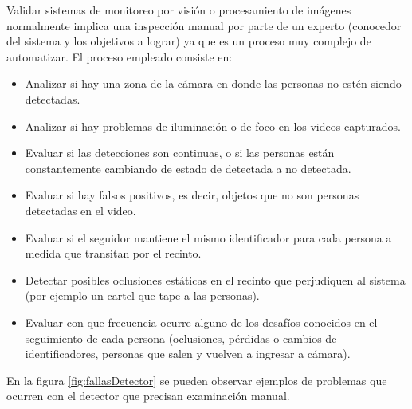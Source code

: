 Validar sistemas de monitoreo por visión o procesamiento de imágenes normalmente implica una inspección manual por parte de un experto (conocedor del sistema y los objetivos a lograr) ya que es un proceso muy complejo de automatizar. El proceso empleado consiste en:

\begin{itemize}
\item Analizar si hay una zona de la cámara en donde las personas no estén siendo detectadas.
\item Analizar si hay problemas de iluminación o de foco en los videos capturados.
\item Evaluar si las detecciones son continuas, o si las personas están constantemente cambiando de estado de detectada a no detectada.
\item Evaluar si hay falsos positivos, es decir, objetos que no son personas detectadas en el video.
\item Evaluar si el seguidor mantiene el mismo identificador para cada persona a medida que transitan por el recinto.
\item Detectar posibles oclusiones estáticas en el recinto que perjudiquen al sistema (por ejemplo un cartel que tape a las personas).
\item Evaluar con que frecuencia ocurre alguno de los desafíos conocidos en el seguimiento de cada persona (oclusiones, pérdidas o cambios de identificadores, personas que salen y vuelven a ingresar a cámara).
\end{itemize}

En la figura \ref{fig:fallasDetector} se pueden observar ejemplos de problemas que ocurren con el detector que precisan examinación manual.


\newpage

